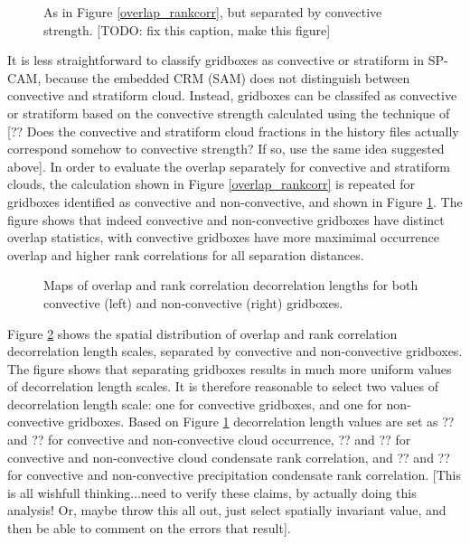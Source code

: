 \begin{figure}
\centering
\caption{As in Figure \ref{overlap_rankcorr}, but separated by convective strength. [TODO: fix this caption, make this figure]}
\label{overlap_rankcorr_convective}
\end{figure}
It is less straightforward to classify gridboxes as convective or stratiform in SP-CAM, because the embedded CRM (SAM) does not distinguish between convective and stratiform cloud. Instead, gridboxes can be classifed as convective or stratiform based on the convective strength calculated using the technique of [?? Does the convective and stratiform cloud fractions in the history files actually correspond somehow to convective strength? If so, use the same idea suggested above]. In order to evaluate the overlap separately for convective and stratiform clouds, the calculation shown in Figure \ref{overlap_rankcorr} is repeated for gridboxes identified as convective and non-convective, and shown in Figure \ref{overlap_rankcorr_convective}. The figure shows that indeed convective and non-convective gridboxes have distinct overlap statistics, with convective gridboxes have more maximimal occurrence overlap and higher rank correlations for all separation distances.

\begin{figure}
\centering
\caption{Maps of overlap and rank correlation decorrelation lengths for both convective (left) and non-convective (right) gridboxes.}
\label{overlap_rankcorr_map_convective}
\end{figure}
Figure \ref{overlap_rankcorr_map_convective} shows the spatial distribution of overlap and rank correlation decorrelation length scales, separated by convective and non-convective gridboxes. The figure shows that separating gridboxes results in much more uniform values of decorrelation length scales. It is therefore reasonable to select two values of decorrelation length scale: one for convective gridboxes, and one for non-convective gridboxes. Based on Figure \ref{overlap_rankcorr_convective} decorrelation length values are set as ?? and ?? for convective and non-convective cloud occurrence, ?? and ?? for convective and non-convective cloud condensate rank correlation, and ?? and ?? for convective and non-convective precipitation condensate rank correlation. [This is all wishfull thinking...need to verify these claims, by actually doing this analysis! Or, maybe throw this all out, just select spatially invariant value, and then be able to comment on the errors that result].

